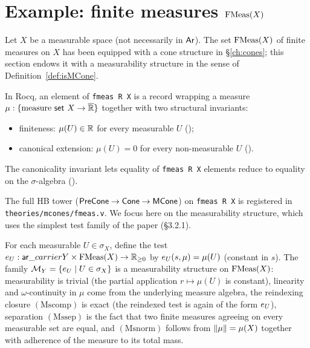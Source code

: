 \section{Example: finite measures
  \texorpdfstring{$\mathrm{FMeas}(X)$}{FMeas(X)}}\label{sec:fmeas}

Let $X$ be a measurable space (not necessarily in $\mathsf{Ar}$). The set
$\mathrm{FMeas}(X)$ of finite measures on $X$ has been equipped with a cone
structure in \S\ref{ch:cones}; this section endows it with a
measurability structure in the sense of
Definition~\ref{def:isMCone}.

\begin{definition}%
  \label{def:fmeas-carrier}
  \rocqok
  In Rocq, an element of \texttt{fmeas R X} is a record wrapping a
  measure $\mu : \{\text{measure}\ \mathsf{set}\ X \to \Rext\}$
  together with two structural invariants:
  \begin{itemize}
    \item finiteness: $\mu(U) \in \mathbb{R}$ for every measurable $U$
      ();
    \item canonical extension: $\mu(U) = 0$ for every non-measurable
      $U$ ().
  \end{itemize}
  The canonicality invariant lets equality of \texttt{fmeas R X}
  elements reduce to equality on the $\sigma$-algebra
  ().
\end{definition}

The full HB tower
($\mathsf{PreCone} \to \mathsf{Cone} \to \mathsf{MCone}$) on \texttt{fmeas R X} is registered in
\texttt{theories/mcones/fmeas.v}. We focus here on the measurability
structure, which uses the simplest test family of the paper
(\S3.2.1).

\begin{definition}%
  \label{def:fmeas-tests}
  \rocqok
  For each measurable $U \in \sigma_X$, define the test
  $e_{U} : \mathsf{ar}\_carrier Y \times \mathrm{FMeas}(X) \to \mathbb{R}_{\geq 0}$ by
  $e_{U}(s, \mu) = \mu(U)$ (constant in $s$). The family
  $\mathcal{M}_Y = \{ e_{U} \mid U \in \sigma_X \}$ is a measurability
  structure on $\mathrm{FMeas}(X)$: measurability is trivial (the partial
  application $r \mapsto \mu(U)$ is constant), linearity and
  $\omega$-continuity in $\mu$ come from the underlying measure
  algebra, the reindexing closure $(\mathrm{Mscomp})$ is exact (the
  reindexed test is again of the form $e_{U}$), separation
  $(\mathrm{Mssep})$ is the fact that two finite measures agreeing on
  every measurable set are equal, and $(\mathrm{Msnorm})$ follows
  from $\lVert \mu \rVert = \mu(X)$ together with adherence of the
  measure to its total mass.
\end{definition}

